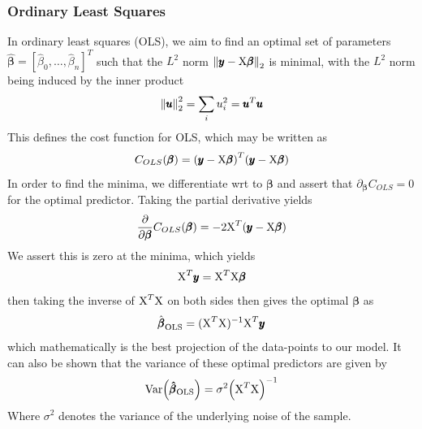 \documentclass[reprint, english, nofootinbib]{revtex4-2}
\begin{document}
        \subsubsection{Ordinary Least Squares}
            \noindent
            In ordinary least squares (OLS), we aim to find an optimal set of parameters $\pmb{\hat\beta} = [\hat\beta_0, \dots, \hat\beta_n]^T$ such that the $L^2$ norm $\norm{\pmb y - \textup{X}\pmb{\beta}}_2$ is minimal, with the $L^2$ norm being induced by the inner product
            \begin{equation}
                \norm{\pmb u}_2^2 = \sum_i u_i^2 = \pmb u^T \pmb u
            \end{equation}
            This defines the cost function for OLS, which may be written as
            \begin{equation}
                C_{OLS}(\pmb \beta)
                = \qty(\pmb y - \textup{X}\pmb \beta)^T(\pmb y - \textup{X}\pmb \beta)
            \end{equation}
            In order to find the minima, we differentiate wrt to $\pmb\beta$ and assert that $\partial_{\pmb\beta}C_{OLS} = 0$ for the optimal predictor. Taking the partial derivative yields
            \begin{align}
                \begin{split}
                \pdv{\pmb\beta}C_{OLS}(\pmb\beta) = -2\textup{X}^T\qty(\pmb y - \textup X\pmb \beta)
                \end{split}
            \end{align}
            We assert this is zero at the minima, which yields
            \begin{equation}
                \textup{X}^T\pmb y = \textup{X}^T\textup{X}\pmb\beta
            \end{equation}
            then taking the inverse of $\textup{X}^T\textup{X}$ on both sides then gives the optimal $\pmb\beta$ as
            \begin{equation}\label{eqn:OLS optimal beta}
                \hat{\pmb \beta}_{\textup{OLS}} = (\textup{X}^T\textup{X})^{-1}\textup{X}^T\pmb y
            \end{equation}
            which mathematically is the best projection of the data-points to our model. It can also be shown that the variance of these optimal predictors are given by \cite{hastie}
            \begin{equation}\label{eqn:OLS beta variance}
                \textup{Var}\qty(\pmb{\hat\beta}_{\textup{OLS}}) = \sigma^2 \qty(\textup{X}^T\textup{X})^{-1}
            \end{equation}
            Where $\sigma^2$ denotes the variance of the underlying noise of the sample.
\end{document}
